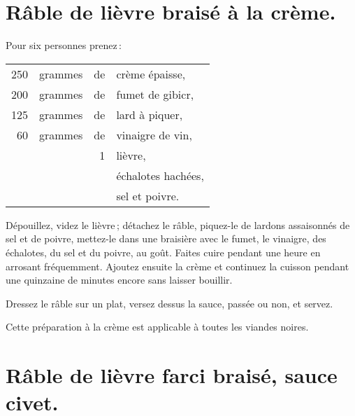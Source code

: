 \section*{\centering Râble de lièvre braisé à la crème.}
{}

Pour six personnes prenez :

\footnotesize
\begin{longtable}{rrrp{16em}}
    250 & grammes & de & crème épaisse,                                                                   \\
    200 & grammes & de & fumet de gibicr,                                                                 \\
    125 & grammes & de & lard à piquer,                                                                   \\
     60 & grammes & de & vinaigre de vin,                                                                 \\
        &         &  1 & lièvre,                                                                          \\
        &         &    & échalotes hachées,                                                               \\
        &         &    & sel et poivre.                                                                   \\
\end{longtable}
\normalsize

Dépouillez, videz le lièvre ; détachez le râble, piquez-le de lardons
assaisonnés de sel et de poivre, mettez-le dans une braisière avec le fumet, le
vinaigre, des échalotes, du sel et du poivre, au goût. Faites cuire pendant une
heure en arrosant fréquemment. Ajoutez ensuite la crème et continuez la cuisson
pendant une quinzaine de minutes encore sans laisser bouillir.

Dressez le râble sur un plat, versez dessus la sauce, passée ou non, et servez.

\sk

Cette préparation à la crème est applicable à toutes les viandes noires.

\section*{\centering Râble de lièvre farci braisé, sauce civet.}
{}

